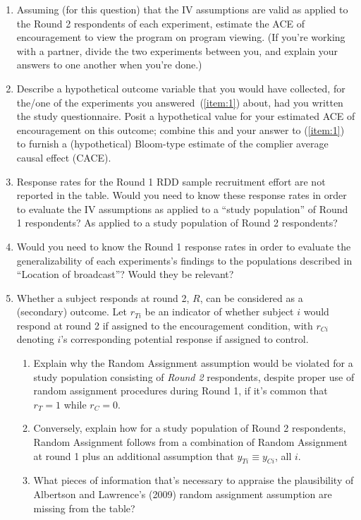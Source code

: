 \documentclass{article}
\begin{document}
\begin{enumerate}
\item \label{item:1}Assuming (for this question) that the IV assumptions are valid as applied to the Round 2 respondents of each experiment, estimate the ACE of encouragement to view the program on program viewing. (If you're working with a partner, divide the two experiments between you, and explain your answers to one another when you're done.)
\item Describe a hypothetical outcome variable that you would have collected, for the/one of the experiments you answered~(\ref{item:1}) about,  had you written the study questionnaire. Posit a hypothetical value for your estimated ACE of encouragement on this outcome; combine this and your answer to (\ref{item:1}) to furnish a (hypothetical) Bloom-type estimate of the complier average causal effect (CACE).  
\item Response rates for the Round 1 RDD sample recruitment effort are not reported in the table. Would you need to know these response rates in order to evaluate the IV assumptions as applied to a ``study population'' of Round 1 respondents?  As applied to a study population of Round 2 respondents? 
\item Would you need to know the Round 1 response rates in order to evaluate the generalizability of each experiments's findings to the populations described in ``Location of broadcast''?  Would they be relevant?  
\item Whether a subject responds at round 2, $R$, can be considered as a (secondary) outcome. Let $r_{Ti}$ be an indicator of whether subject $i$ would respond at round 2 if assigned to the encouragement condition, with $r_{Ci}$ denoting $i$'s corresponding potential response if assigned to control.
  \begin{enumerate}
  \item Explain why the Random Assignment assumption would be violated for a study population consisting of \textit{Round 2} respondents, despite proper use of random assignment procedures during Round 1, if it's common that $r_{T}=1$ while $r_{C}=0$.
  \item Conversely, explain how for a study population of Round 2 respondents, Random Assignment follows from a combination of Random Assignment at round 1 plus an additional assumption that $y_{Ti} \equiv y_{Ci}$, all $i$. 
  \item What pieces of information that's necessary to appraise the plausibility of Albertson and Lawrence's (2009) random assignment assumption are missing from the table? 
  \end{enumerate}

\end{enumerate}
\end{document}
